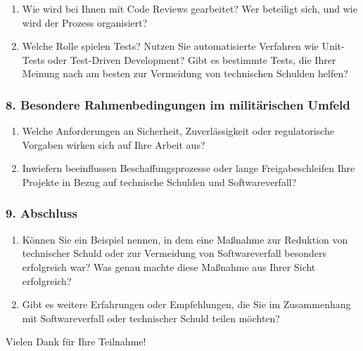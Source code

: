 \begin{enumerate}[resume]
  \item Wie wird bei Ihnen mit Code Reviews gearbeitet? Wer beteiligt sich, und wie wird der Prozess organisiert?
  \item Welche Rolle spielen Tests? Nutzen Sie automatisierte Verfahren wie Unit-Tests oder Test-Driven Development? Gibt es bestimmte Tests, die Ihrer Meinung nach am besten zur Vermeidung von technischen Schulden helfen?
\end{enumerate}

\subsubsection*{8. Besondere Rahmenbedingungen im militärischen Umfeld}

\begin{enumerate}[resume]
  \item Welche Anforderungen an Sicherheit, Zuverlässigkeit oder regulatorische Vorgaben wirken sich auf Ihre Arbeit aus?
  \item Inwiefern beeinflussen Beschaffungsprozesse oder lange Freigabeschleifen Ihre Projekte in Bezug auf technische Schulden und Softwareverfall?
\end{enumerate}

\subsubsection*{9. Abschluss}

\begin{enumerate}[resume]
  \item Können Sie ein Beispiel nennen, in dem eine Maßnahme zur Reduktion von technischer Schuld oder zur Vermeidung von Softwareverfall besonders erfolgreich war? Was genau machte diese Maßnahme aus Ihrer Sicht erfolgreich?
  \item Gibt es weitere Erfahrungen oder Empfehlungen, die Sie im Zusammenhang mit Softwareverfall oder technischer Schuld teilen möchten?
\end{enumerate}


Vielen Dank für Ihre Teilnahme!
